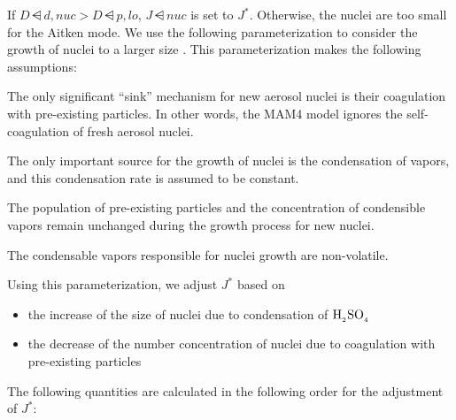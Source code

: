 If $D\dsub{d,nuc} > D\dsub{p,lo}$, $J\dsub{nuc}$ is set to $J^*$. Otherwise,
the nuclei are too small for the Aitken mode. We use the following
parameterization to consider the growth of nuclei to a larger size
\cite{kerminen-2002-jas}. This parameterization makes the following assumptions:

\begin{assume}
  The only significant ``sink'' mechanism for new aerosol nuclei is their
  coagulation with pre-existing particles. In other words, the MAM4 model
  ignores the self-coagulation of fresh aerosol nuclei.
\end{assume}

\begin{assume}
  The only important source for the growth of nuclei is the condensation
  of vapors, and this condensation rate is assumed to be constant.
\end{assume}

\begin{assume}
  The population of pre-existing particles and the concentration of
  condensible vapors remain unchanged during the growth process for new
  nuclei.
\end{assume}

\begin{assume}
  The condensable vapors responsible for nuclei growth are non-volatile.
\end{assume}

Using this parameterization, we adjust $J^*$ based on

\begin{itemize}
  \item the increase of the size of nuclei due to condensation of $\rm H_{_2}SO_{_4}$
  \item the decrease of the number concentration of nuclei due to
        coagulation with pre-existing particles
\end{itemize}

The following quantities are calculated in the following order for the
adjustment of $J^*$:

